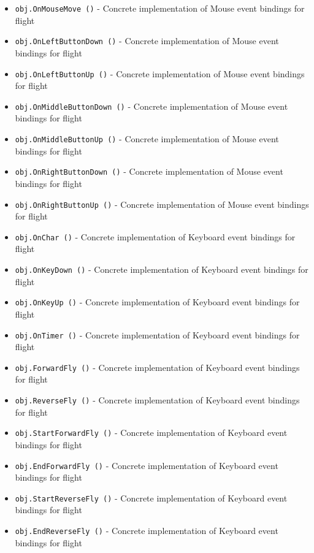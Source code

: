 \begin{itemize}
\item  \verb|obj.OnMouseMove ()| -  Concrete implementation of Mouse event bindings for flight

\item  \verb|obj.OnLeftButtonDown ()| -  Concrete implementation of Mouse event bindings for flight

\item  \verb|obj.OnLeftButtonUp ()| -  Concrete implementation of Mouse event bindings for flight

\item  \verb|obj.OnMiddleButtonDown ()| -  Concrete implementation of Mouse event bindings for flight

\item  \verb|obj.OnMiddleButtonUp ()| -  Concrete implementation of Mouse event bindings for flight

\item  \verb|obj.OnRightButtonDown ()| -  Concrete implementation of Mouse event bindings for flight

\item  \verb|obj.OnRightButtonUp ()| -  Concrete implementation of Mouse event bindings for flight

\item  \verb|obj.OnChar ()| -  Concrete implementation of Keyboard event bindings for flight

\item  \verb|obj.OnKeyDown ()| -  Concrete implementation of Keyboard event bindings for flight

\item  \verb|obj.OnKeyUp ()| -  Concrete implementation of Keyboard event bindings for flight

\item  \verb|obj.OnTimer ()| -  Concrete implementation of Keyboard event bindings for flight

\item  \verb|obj.ForwardFly ()| -  Concrete implementation of Keyboard event bindings for flight


\item  \verb|obj.ReverseFly ()| -  Concrete implementation of Keyboard event bindings for flight


\item  \verb|obj.StartForwardFly ()| -  Concrete implementation of Keyboard event bindings for flight



\item  \verb|obj.EndForwardFly ()| -  Concrete implementation of Keyboard event bindings for flight



\item  \verb|obj.StartReverseFly ()| -  Concrete implementation of Keyboard event bindings for flight



\item  \verb|obj.EndReverseFly ()| -  Concrete implementation of Keyboard event bindings for flight



\end{itemize}
